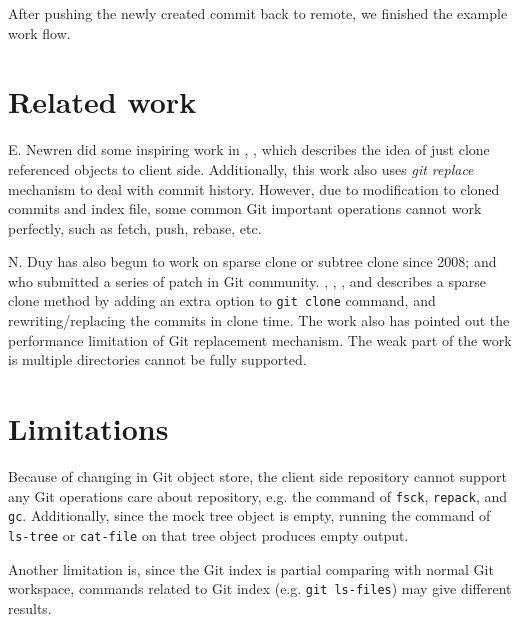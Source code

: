 \documentclass[preprint]{sigplanconf}
\begin{document}
After pushing the newly created commit back to remote, we finished the
example work flow.

\section{Related work}
E. Newren did some inspiring work in \cite{newren10-0}, \cite{newren10-1},
which describes the idea of just clone referenced objects to client side.
Additionally, this work also uses \emph{git replace} mechanism to deal with
commit history\cite{git-replace}.
However, due to modification to cloned commits and index file, some common Git
important operations cannot work perfectly, such as fetch, push, rebase, etc.

N. Duy has also begun to work on sparse clone or subtree clone since 2008; and
who submitted a series of patch in Git community.
\cite{duy08}, \cite{duy10-1}, \cite{duy10-2}, and \cite{duy10-3} describes a
sparse clone method by adding an extra option to \verb|git clone| command, and
rewriting/replacing the commits in clone time.
The work also has pointed out the performance limitation of Git replacement
mechanism.
The weak part of the work is multiple directories cannot be fully supported.

\section{Limitations}
Because of changing in Git object store, the client side repository cannot
support any Git operations care about repository, e.g. the command of
\verb|fsck|, \verb|repack|, and \verb|gc|.
Additionally, since the mock tree object is empty, running the command of
\verb|ls-tree| or \verb|cat-file| on that tree object produces empty output.

Another limitation is, since the Git index is partial comparing with normal Git
workspace, commands related to Git index (e.g. \verb|git ls-files|) may give
different results.
\end{document}
